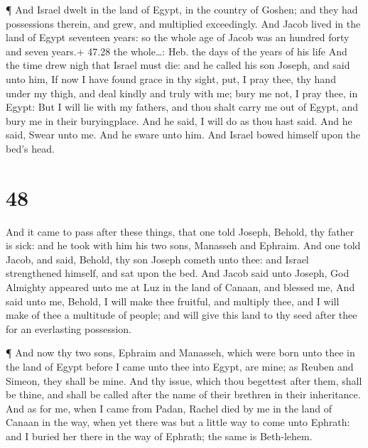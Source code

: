  ¶ And Israel dwelt in the land of Egypt, in the country of
Goshen; and they had possessions therein, and grew, and multiplied
exceedingly.  And Jacob lived in the land of Egypt
seventeen years: so the whole age of Jacob was an hundred forty and
seven years.+ 47.28 the whole\ldots: Heb. the days of the years of his
life  And the time drew nigh that Israel must die: and he
called his son Joseph, and said unto him, If now I have found grace in
thy sight, put, I pray thee, thy hand under my thigh, and deal kindly
and truly with me; bury me not, I pray thee, in Egypt:  But
I will lie with my fathers, and thou shalt carry me out of Egypt, and
bury me in their buryingplace. And he said, I will do as thou hast said.
 And he said, Swear unto me. And he sware unto him. And
Israel bowed himself upon the bed's head.

\hypertarget{section-47}{%
\section{48}\label{section-47}}

 And it came to pass after these things, that one told
Joseph, Behold, thy father is sick: and he took with him his two sons,
Manasseh and Ephraim.  And one told Jacob, and said, Behold,
thy son Joseph cometh unto thee: and Israel strengthened himself, and
sat upon the bed.  And Jacob said unto Joseph, God Almighty
appeared unto me at Luz in the land of Canaan, and blessed me,
 And said unto me, Behold, I will make thee fruitful, and
multiply thee, and I will make of thee a multitude of people; and will
give this land to thy seed after thee for an everlasting possession.

 ¶ And now thy two sons, Ephraim and Manasseh, which were
born unto thee in the land of Egypt before I came unto thee into Egypt,
are mine; as Reuben and Simeon, they shall be mine.  And thy
issue, which thou begettest after them, shall be thine, and shall be
called after the name of their brethren in their inheritance.
 And as for me, when I came from Padan, Rachel died by me in
the land of Canaan in the way, when yet there was but a little way to
come unto Ephrath: and I buried her there in the way of Ephrath; the
same is Beth-lehem.

